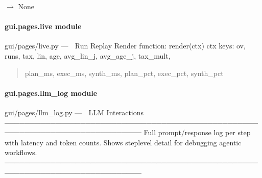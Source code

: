 \documentclass[letterpaper,10pt,english]{sphinxmanual}
\begin{document}
\begin{fulllineitems}
\label{\detokenize{gui.pages.hypotheses:gui.pages.hypotheses.render}}
\pysigstartsignatures
\pysiglinewithargsret
{}
{}
{{ $\rightarrow$ None}}
\pysigstopsignatures
\end{fulllineitems}


\sphinxstepscope


\paragraph{gui.pages.live module}
\label{\detokenize{gui.pages.live:module-gui.pages.live}}\label{\detokenize{gui.pages.live:gui-pages-live-module}}\label{\detokenize{gui.pages.live::doc}}
\sphinxAtStartPar
gui/pages/live.py  —  📼  Run Replay
Render function: render(ctx)
ctx keys: ov, runs, tax, lin, age, avg\_lin\_j, avg\_age\_j, tax\_mult,
\begin{quote}

\sphinxAtStartPar
plan\_ms, exec\_ms, synth\_ms, plan\_pct, exec\_pct, synth\_pct
\end{quote}

\begin{fulllineitems}
\label{\detokenize{gui.pages.live:gui.pages.live.render}}
\pysigstartsignatures
\pysiglinewithargsret
{}
{}
{}
\pysigstopsignatures
\end{fulllineitems}


\sphinxstepscope


\paragraph{gui.pages.llm\_log module}
\label{\detokenize{gui.pages.llm_log:module-gui.pages.llm_log}}\label{\detokenize{gui.pages.llm_log:gui-pages-llm-log-module}}\label{\detokenize{gui.pages.llm_log::doc}}
\sphinxAtStartPar
gui/pages/llm\_log.py  —  💬  LLM Interactions
─────────────────────────────────────────────────────────────────────────────
Full prompt/response log per step with latency and token counts.
Shows step\sphinxhyphen{}level detail for debugging agentic workflows.
─────────────────────────────────────────────────────────────────────────────
\end{document}
